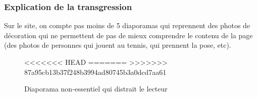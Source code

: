 \documentclass{article}[12pt]
\begin{document}
    	    \subsubsection*{Explication de la transgression}
    	       Sur le site, on compte pas moins de 5 diaporamas qui reprennent des photos de décoration qui ne permettent de pas de mieux comprendre le contenu de la page (des photos de personnes qui jouent au tennis, qui prennent la pose, etc). 
    	       \begin{figure}[H]
    	       	\centering
<<<<<<< HEAD
=======
>>>>>>> 87a95cb13b37f248b3994ad80745b3a0dcd7aa61
    	       	\caption{Diaporama non-essentiel qui distrait le lecteur}
    	       \end{figure}
\end{document}

